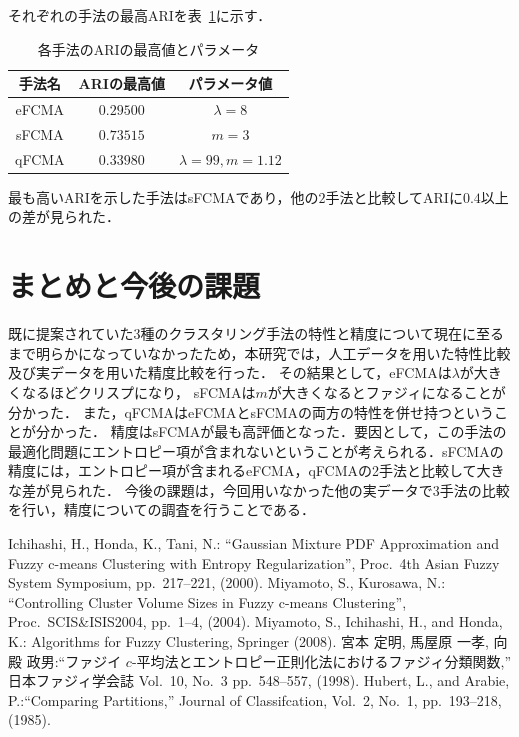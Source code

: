 \documentclass[twocolumn, a4paper]{icethesisabst}
\begin{document}
それぞれの手法の最高ARIを表~\ref{tbl:max_ari}に示す．

\begin{table}[htbp]
 \centering
 \caption{各手法のARIの最高値とパラメータ}
  \begin{center}
   \begin{tabular}{ c || c | c }\hline
    手法名 & ARIの最高値 & パラメータ値\\ \hline \hline
    eFCMA & $0.29500$& $\lambda = 8$\\ \hline  
    sFCMA & $0.73515$ & $m = 3$\\ \hline
    qFCMA & $0.33980$ & $\lambda = 99, m = 1.12$\\  \hline
   \end{tabular}
   \label{tbl:max_ari}
  \end{center}
\end{table}

最も高いARIを示した手法はsFCMAであり，他の$2$手法と比較してARIに$0.4$以上の差が見られた．


\section{まとめと今後の課題}
既に提案されていた3種のクラスタリング手法の特性と精度について現在に至るまで明らかになっていなかったため，本研究では，人工データを用いた特性比較及び実データを用いた精度比較を行った．
その結果として，eFCMAは$\lambda$が大きくなるほどクリスプになり，
sFCMAは$m$が大きくなるとファジィになることが分かった．
また，qFCMAはeFCMAとsFCMAの両方の特性を併せ持つということが分かった．
精度はsFCMAが最も高評価となった．要因として，この手法の最適化問題にエントロピー項が含まれないということが考えられる．sFCMAの精度には，エントロピー項が含まれるeFCMA，qFCMAの2手法と比較して大きな差が見られた．
今後の課題は，今回用いなかった他の実データで$3$手法の比較を行い，精度についての調査を行うことである．


\begin{thebibliography}{5}
Ichihashi, H., Honda, K., Tani, N.: ``Gaussian Mixture PDF Approximation and Fuzzy c-means Clustering with Entropy Regularization'', Proc.~4th Asian Fuzzy System Symposium, pp.~217--221, (2000).
Miyamoto, S., Kurosawa, N.: ``Controlling Cluster Volume Sizes in Fuzzy c-means Clustering'', Proc.~SCIS\&ISIS2004, pp.~1--4, (2004).
Miyamoto, S., Ichihashi, H., and Honda, K.: Algorithms for Fuzzy Clustering, Springer (2008).
宮本 定明, 馬屋原 一孝, 向殿 政男:``ファジイ $c$-平均法とエントロピー正則化法におけるファジィ分類関数,''  日本ファジィ学会誌 Vol.~10, No.~3  pp.~548--557, (1998).
 Hubert, L., and Arabie, P.:``Comparing Partitions,'' Journal of Classifcation, Vol.~2, No.~1,
pp.~193--218, (1985).
\end{thebibliography}
\end{document}
